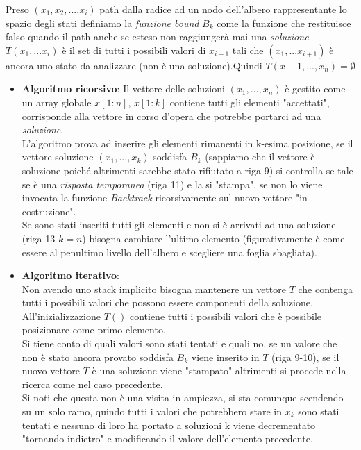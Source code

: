 \documentclass[a4paper]{article}
\begin{document}
Preso $(x_1,x_2,....x_i)$ path dalla radice ad un nodo dell'albero rappresentante lo spazio degli stati definiamo la \textit{funzione bound} $B_k$ come la funzione che restituisce falso quando il path anche se esteso non raggiungerà mai una \textit{soluzione}.\\
$T(x_1,...x_i)$ è il set di tutti i possibili valori di $x_{i+1}$ tali che $(x_1,...x_{i+1})$ è ancora uno stato da analizzare (non è una soluzione).Quindi $T(x-1,...,x_n) = \emptyset$
\begin{itemize}
	\item \textbf{Algoritmo ricorsivo}:
		Il vettore delle soluzioni $(x_1, ... , x_n)$ è gestito come un array globale $x[1:n]$, $x[1:k]$ contiene tutti gli elementi "accettati", corrisponde alla vettore in corso d'opera che potrebbe portarci ad una \textit{soluzione}.\\
		L'algoritmo prova ad inserire gli elementi rimanenti in k-esima posizione, se il vettore soluzione $(x_1,...,x_k)$ soddisfa $B_k$ (sappiamo che il vettore è soluzione poiché altrimenti sarebbe stato rifiutato a riga 9) si controlla se tale se è una \textit{risposta temporanea} (riga 11) e la si "stampa", se non lo viene invocata la funzione \textit{Backtrack} ricorsivamente sul nuovo vettore "in costruzione".\\
		Se sono stati inseriti tutti gli elementi e non si è arrivati ad una soluzione (riga 13 $k=n$) bisogna cambiare l'ultimo elemento (figurativamente è come essere al penultimo livello dell'albero e scegliere una foglia sbagliata).
	\item \textbf{Algoritmo iterativo}:\\
		Non avendo uno stack implicito bisogna mantenere un vettore $T$ che contenga tutti i possibili valori che possono essere componenti della soluzione.
		All'inizializzazione $T()$ contiene tutti i possibili valori che è possibile posizionare come primo elemento.\\
		Si tiene conto di quali valori sono stati tentati e quali no, se un valore che non è stato ancora provato soddisfa $B_k$ viene inserito in $T$ (riga 9-10), se il nuovo vettore $T$ è una soluzione viene "stampato" altrimenti si procede nella ricerca come nel caso precedente.\\
		Si noti che questa non è una visita in ampiezza, si sta comunque scendendo su un solo ramo, quindo tutti i valori che potrebbero stare in $x_k$ sono stati tentati e nessuno di loro ha portato a soluzioni k viene decrementato "tornando indietro" e modificando il valore dell'elemento precedente.
\end{itemize}
\end{document}
